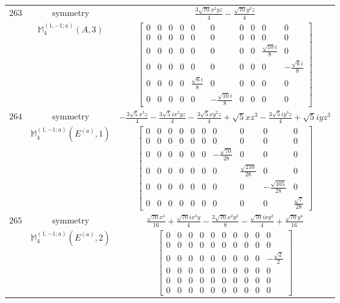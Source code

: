 \documentclass[fleqn,8pt,landscape]{jsarticle}
\begin{document}
\begin{longtable}{ccc}
$ 263 $ & $ \text{symmetry} $ & $ \frac{3 \sqrt{70} x^{2} y z}{4} - \frac{\sqrt{70} y^{3} z}{4} $ \\
$  $ & $ \mathbb{M}_{4}^{(1,-1;a)}(A,3) $ & $ \begin{bmatrix} 0 & 0 & 0 & 0 & 0 & 0 & 0 & 0 & 0 & 0 \\ 0 & 0 & 0 & 0 & 0 & 0 & 0 & 0 & 0 & 0 \\ 0 & 0 & 0 & 0 & 0 & 0 & 0 & 0 & \frac{\sqrt{10} i}{8} & 0 \\ 0 & 0 & 0 & 0 & 0 & 0 & 0 & 0 & 0 & - \frac{\sqrt{6} i}{8} \\ 0 & 0 & 0 & 0 & \frac{\sqrt{6} i}{8} & 0 & 0 & 0 & 0 & 0 \\ 0 & 0 & 0 & 0 & 0 & - \frac{\sqrt{10} i}{8} & 0 & 0 & 0 & 0 \end{bmatrix} $ \\ \hline
$ 264 $ & $ \text{symmetry} $ & $ - \frac{3 \sqrt{5} x^{3} z}{4} - \frac{3 \sqrt{5} i x^{2} y z}{4} - \frac{3 \sqrt{5} x y^{2} z}{4} + \sqrt{5} x z^{3} - \frac{3 \sqrt{5} i y^{3} z}{4} + \sqrt{5} i y z^{3} $ \\
$  $ & $ \mathbb{M}_{4}^{(1,-1;a)}(E^{(a)},1) $ & $ \begin{bmatrix} 0 & 0 & 0 & 0 & 0 & 0 & 0 & 0 & 0 & 0 \\ 0 & 0 & 0 & 0 & 0 & 0 & 0 & 0 & 0 & 0 \\ 0 & 0 & 0 & 0 & 0 & 0 & - \frac{\sqrt{70}}{28} & 0 & 0 & 0 \\ 0 & 0 & 0 & 0 & 0 & 0 & 0 & \frac{\sqrt{210}}{28} & 0 & 0 \\ 0 & 0 & 0 & 0 & 0 & 0 & 0 & 0 & - \frac{\sqrt{105}}{28} & 0 \\ 0 & 0 & 0 & 0 & 0 & 0 & 0 & 0 & 0 & \frac{\sqrt{7}}{28} \end{bmatrix} $ \\ \hline
$ 265 $ & $ \text{symmetry} $ & $ \frac{\sqrt{70} x^{4}}{16} + \frac{\sqrt{70} i x^{3} y}{4} - \frac{3 \sqrt{70} x^{2} y^{2}}{8} - \frac{\sqrt{70} i x y^{3}}{4} + \frac{\sqrt{70} y^{4}}{16} $ \\
$  $ & $ \mathbb{M}_{4}^{(1,-1;a)}(E^{(a)},2) $ & $ \begin{bmatrix} 0 & 0 & 0 & 0 & 0 & 0 & 0 & 0 & 0 & 0 \\ 0 & 0 & 0 & 0 & 0 & 0 & 0 & 0 & 0 & 0 \\ 0 & 0 & 0 & 0 & 0 & 0 & 0 & 0 & 0 & - \frac{\sqrt{2}}{2} \\ 0 & 0 & 0 & 0 & 0 & 0 & 0 & 0 & 0 & 0 \\ 0 & 0 & 0 & 0 & 0 & 0 & 0 & 0 & 0 & 0 \\ 0 & 0 & 0 & 0 & 0 & 0 & 0 & 0 & 0 & 0 \end{bmatrix} $ \\ \hline

\end{longtable}
\end{document}

